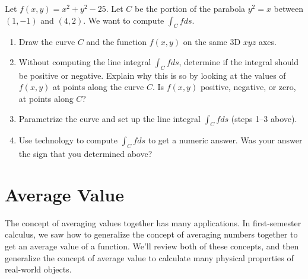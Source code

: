 



\begin{problem}%
%
 Let $f(x,y)=x^2+y^2-25$. Let $C$ be the portion of the parabola $y^2=x$ between $(1,-1)$ and $(4,2)$. We want to compute $\int_C fds$.  
\begin{enumerate}
\item Draw the curve $C$ and the function $f(x,y)$ on the same 3D $xyz$ axes.
 \item Without computing the line integral $\int_C fds$, determine if the integral should be positive or negative. Explain why this is so by looking at the values of $f(x,y)$ at points along the curve $C$.  Is $f(x,y)$ positive, negative, or zero, at points along $C$?
 \item Parametrize the curve and set up the line integral $\int_C f ds$ (steps 1--3 above).
 \item Use technology to compute $\int_C fds$ to get a numeric answer.  Was your answer the sign that you determined above?
\end{enumerate}
\end{problem}

\section{Average Value}

The concept of averaging values together has many applications.  In first-semester calculus, we saw how to generalize the concept of averaging numbers together to get an average value of a function.  We'll review both of these concepts, and then generalize the concept of average value to calculate many physical properties of real-world objects.

